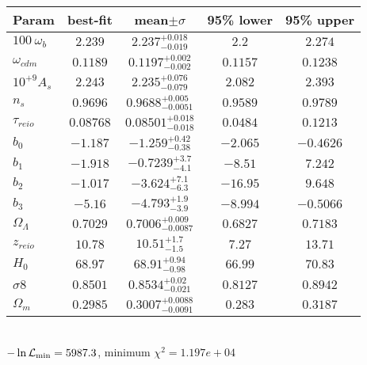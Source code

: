 \begin{tabular}{|l|c|c|c|c|} 
 \hline 
Param & best-fit & mean$\pm\sigma$ & 95\% lower & 95\% upper \\ \hline 
$100~\omega_{b }$ &$2.239$ & $2.237_{-0.019}^{+0.018}$ & $2.2$ & $2.274$ \\ 
$\omega_{cdm }$ &$0.1189$ & $0.1197_{-0.002}^{+0.002}$ & $0.1157$ & $0.1238$ \\ 
$10^{+9}A_{s }$ &$2.243$ & $2.235_{-0.079}^{+0.076}$ & $2.082$ & $2.393$ \\ 
$n_{s }$ &$0.9696$ & $0.9688_{-0.0051}^{+0.005}$ & $0.9589$ & $0.9789$ \\ 
$\tau_{reio }$ &$0.08768$ & $0.08501_{-0.018}^{+0.018}$ & $0.0484$ & $0.1213$ \\ 
$b_{0 }$ &$-1.187$ & $-1.259_{-0.38}^{+0.42}$ & $-2.065$ & $-0.4626$ \\ 
$b_{1 }$ &$-1.918$ & $-0.7239_{-4.1}^{+3.7}$ & $-8.51$ & $7.242$ \\ 
$b_{2 }$ &$-1.017$ & $-3.624_{-6.3}^{+7.1}$ & $-16.95$ & $9.648$ \\ 
$b_{3 }$ &$-5.16$ & $-4.793_{-3.9}^{+1.9}$ & $-8.994$ & $-0.5066$ \\ 
$\Omega_{\Lambda }$ &$0.7029$ & $0.7006_{-0.0087}^{+0.009}$ & $0.6827$ & $0.7183$ \\ 
$z_{reio }$ &$10.78$ & $10.51_{-1.5}^{+1.7}$ & $7.27$ & $13.71$ \\ 
$H_{0 }$ &$68.97$ & $68.91_{-0.98}^{+0.94}$ & $66.99$ & $70.83$ \\ 
$\sigma8$ &$0.8501$ & $0.8534_{-0.021}^{+0.02}$ & $0.8127$ & $0.8942$ \\ 
$\Omega_{m }$ &$0.2985$ & $0.3007_{-0.0091}^{+0.0088}$ & $0.283$ & $0.3187$ \\ 
\hline 
 \end{tabular} \\ 
$-\ln{\cal L}_\mathrm{min} =5987.3$, minimum $\chi^2=1.197e+04$ \\ 
